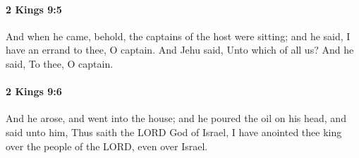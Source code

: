 		\paragraph{2 Kings 9:5} %
			\label{2KINGS-9-5}

			And when he came, behold, the captains of the host were sitting; and he said, I have an errand to thee, O captain. And Jehu said, Unto which of all us? And he said, To thee, O captain.


		\paragraph{2 Kings 9:6} %
			\label{2KINGS-9-6}

			And he arose, and went into the house; and he poured the oil on his head, and said unto him, Thus saith the LORD God of Israel, I have anointed thee king over the people of the LORD, even over Israel.

